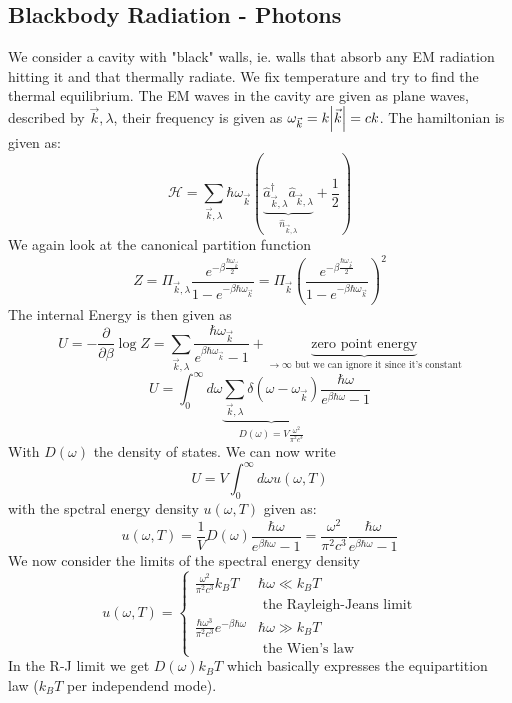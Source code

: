 \documentclass{report}
\begin{document}
\subsection{Blackbody Radiation - Photons}
We consider a cavity with "black" walls, ie. walls that absorb any EM radiation hitting it and that thermally radiate. We fix temperature and try to find the thermal equilibrium. The EM waves in the cavity are given as plane waves, described by $\vec{k}, \lambda$, their frequency is given as $\omega_{\vec{k}} = k \abs{\vec{k}} = c k$. The hamiltonian is given as: \[
  \mathcal{H} = \sum_{\vec{k}, \lambda}^{}  \hbar \omega_{\vec{k}} \left( \underbrace{ \hat{a}_{\vec{k},\lambda}^{\dagger}\hat{a}_{\vec{k},\lambda} }_{\hat{n}_{\vec{k},\lambda}} + \frac{1}{2}  \right) 
\] 
We again look at the canonical partition function \[
Z = \Pi_{\vec{k}, \lambda} \frac{e^{-\beta \frac{\hbar \omega_{\vec{k}}}{2}}}{1 - e^{-\beta \hbar \omega_{\vec{k}}}} = \Pi_{\vec{k}} 
\left( \frac{e^{-\beta \frac{\hbar \omega_{\vec{k}}}{2}}}{1 - e^{-\beta \hbar \omega_{\vec{k}}}} \right)^2 
\] 
The internal Energy is then given as \[
  U = -\frac{\partial }{\partial \beta} \log Z = \sum_{\vec{k}, \lambda}^{} \frac{\hbar \omega_{\vec{k}}}{e^{\beta \hbar \omega_{\vec{k}}} - 1} + \underbrace{\text{zero point energy}}_{\to \infty \text{ but we can ignore it since it's constant}}
\] \[
U = \int_0^{\infty} d\omega \underbrace{\sum_{\vec{k}, \lambda}^{} \delta\left( \omega - \omega_{\vec{k}} \right)}_{D\left( \omega \right) = V \frac{\omega^2}{\pi^2 c^3}} \frac{\hbar \omega}{e^{\beta \hbar \omega} - 1}
\] 
With $D\left( \omega \right) $ the density of states. We can now write \[
  U = V \int_0^{\infty} d\omega u\left( \omega, T \right) 
  \] with the spctral energy density $u\left( \omega, T \right) $ given as: \[
u\left( \omega, T \right) = \frac{1}{V} D\left( \omega \right) \frac{\hbar \omega}{e^{\beta \hbar \omega} - 1} 
= \frac{\omega^2}{\pi^2 c^{3}} \frac{\hbar \omega}{e^{\beta \hbar \omega} -1}
\] 
We now consider the limits of the spectral energy density \[
  u\left( \omega, T \right) = \begin{cases}
    \frac{\omega^2}{\pi^2 c ^3} k_B T & \hbar \omega \ll k_B T\\ & \text{ the Rayleigh-Jeans limit}\\
    \frac{\hbar \omega ^3}{\pi^2 c ^3} e^{-\beta \hbar \omega} & \hbar \omega \gg k_B T \\ & \text{ the Wien's law}
  \end{cases}
\] 
In the R-J limit we get $D\left( \omega \right) k_B T$ which basically expresses the equipartition law ($k_B T$ per independend mode). 
\end{document}
